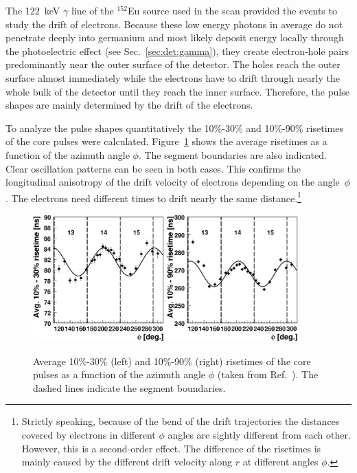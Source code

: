 The 122~keV $\gamma$ line of the $^{152}$Eu source used in the scan provided the events to study the drift of electrons. Because these low energy photons in average do not penetrate deeply into germanium and most likely deposit energy locally through the photoelectric effect (see Sec.~\ref{sec:det:gamma}), they create electron-hole pairs predominantly near the outer surface of the detector. The holes reach the outer surface almost immediately while the electrons have to drift through nearly the whole bulk of the detector until they reach the inner surface. Therefore, the pulse shapes are mainly determined by the drift of the electrons. 

To analyze the pulse shapes quantitatively the 10\%-30\% and 10\%-90\% risetimes of the core pulses were calculated. Figure~\ref{fig:psa:rt10} shows the average risetimes as a function of the azimuth angle $\phi$. The segment boundaries
are also indicated. Clear oscillation patterns can be seen in both cases. This confirms the longitudinal anisotropy of the drift velocity of electrons depending on the angle~$\phi$. The electrons need different times to drift nearly the same distance.\footnote{Strictly speaking, because of the bend of the drift trajectories the distances covered by electrons in different $\phi$ angles are sightly different from each other. However, this is a second-order effect. The difference of the risetimes is mainly caused by the different drift velocity along $r$ at different angles $\phi$.}
\begin{figure}[htbp]
\centering
\includegraphics[width=0.45\textwidth]{phi_risetime1030}
\includegraphics[width=0.45\textwidth]{phi_risetime1090}
\caption{Average 10\%-30\% (left) and 10\%-90\% (right) risetimes of the core pulses as a function of the azimuth angle $\phi$ (taken from Ref.~\cite{Sie07}).
The dashed lines indicate the segment boundaries.}
\label{fig:psa:rt10}
\end{figure}


